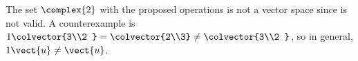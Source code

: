 %
The set $\complex{2}$ with the proposed operations is not a vector space since  is not valid.  A counterexample is $1\colvector{3\\2 } = \colvector{2\\3}\ne\colvector{3\\2 }$, so in general, $1\vect{u}\ne\vect{u}$. 